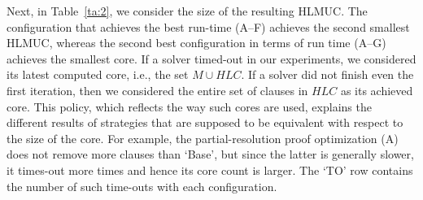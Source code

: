 \documentclass[twoside,11pt]{article}
\begin{document}
Next, in Table~\ref{ta:2}, we consider the size of the resulting HLMUC. The configuration that
achieves the best run-time (A--F) achieves the second smallest HLMUC, whereas
the second best configuration in terms of run time (A--G) achieves the
smallest core. If a solver timed-out in our experiments, we considered its
latest computed core, i.e., the set $M \cup HLC$. If a solver did
not finish even the first iteration, then we considered the entire set of
clauses in $HLC$ as its achieved core. This policy, which reflects the way
such cores are used, explains the different results of strategies that are
supposed to be equivalent with respect to the size of the core. For example,
the partial-resolution proof optimization (A) does not remove more
clauses than `Base', but since the latter is generally slower, it times-out
more times and hence its core count is larger. The `TO' row contains the
number of such time-outs with each configuration.
\end{document}
